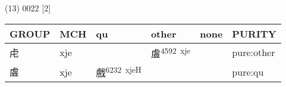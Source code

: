 \documentclass[14pt,a4paper]{scrartcl}
\begin{document}
(13) 0022 {[}2{]}

\begin{longtable}[c]{@{}llllll@{}}
\toprule
\begin{minipage}[b]{0.14\columnwidth}\raggedright\strut
GROUP
\strut\end{minipage} &
\begin{minipage}[b]{0.14\columnwidth}\raggedright\strut
MCH
\strut\end{minipage} &
\begin{minipage}[b]{0.14\columnwidth}\raggedright\strut
qu
\strut\end{minipage} &
\begin{minipage}[b]{0.14\columnwidth}\raggedright\strut
other
\strut\end{minipage} &
\begin{minipage}[b]{0.14\columnwidth}\raggedright\strut
none
\strut\end{minipage} &
\begin{minipage}[b]{0.14\columnwidth}\raggedright\strut
PURITY
\strut\end{minipage}\tabularnewline
\midrule
\endhead
\begin{minipage}[t]{0.14\columnwidth}\raggedright\strut
虍
\strut\end{minipage} &
\begin{minipage}[t]{0.14\columnwidth}\raggedright\strut
xje
\strut\end{minipage} &
\begin{minipage}[t]{0.14\columnwidth}\raggedright\strut
\strut\end{minipage} &
\begin{minipage}[t]{0.14\columnwidth}\raggedright\strut
䖒\textsuperscript{4592~xje}
\strut\end{minipage} &
\begin{minipage}[t]{0.14\columnwidth}\raggedright\strut
\strut\end{minipage} &
\begin{minipage}[t]{0.14\columnwidth}\raggedright\strut
pure:other
\strut\end{minipage}\tabularnewline
\begin{minipage}[t]{0.14\columnwidth}\raggedright\strut
䖒
\strut\end{minipage} &
\begin{minipage}[t]{0.14\columnwidth}\raggedright\strut
xje
\strut\end{minipage} &
\begin{minipage}[t]{0.14\columnwidth}\raggedright\strut
戲\textsuperscript{6232~xjeH}
\strut\end{minipage} &
\begin{minipage}[t]{0.14\columnwidth}\raggedright\strut
\strut\end{minipage} &
\begin{minipage}[t]{0.14\columnwidth}\raggedright\strut
\strut\end{minipage} &
\begin{minipage}[t]{0.14\columnwidth}\raggedright\strut
pure:qu
\strut\end{minipage}\tabularnewline
\bottomrule
\end{longtable}
\end{document}
